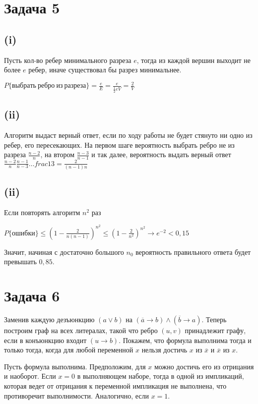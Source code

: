 \documentclass[a4paper,12pt]{article} %
\begin{document}
\section{Задача 5}
\subsection{(i)}
\hspace{5mm}
Пусть кол-во ребер минимального разреза $e$, тогда из каждой вершин выходит не более $e$ ребер, иначе существовал бы разрез минимальнее. 

$P\{выбрать\ ребро\ из\ разреза\}=\frac{e}{E}=\frac{e}{\frac{1}{2}eV}=\frac{2}{V}$

\subsection{(ii)}
\hspace{5mm}
Алгоритм выдаст верный ответ, если по ходу работы не будет стянуто ни одно из ребер, его пересекающих. На первом шаге вероятность выбрать ребро не из разреза $\frac{n-2}{n}$, на втором $\frac{n-3}{n-1}$ и так далее, вероятность выдать верный ответ $\frac{n-2}{n}\frac{n-1}{n-3}\ldots{frac{1}{3}=\frac{2}{(n-1)n}}$

\subsection{(ii)}
\hspace{5mm}
Если повторять алгоритм $n^2$ раз

$P\{ошибки\}\leq\left( 1-\frac{2}{n(n-1)}\right)^{n^2}\leq \left( 1-\frac{2}{n^2}\right)^{n^2}\rightarrow e^{-2} < 0,15$

Значит, начиная с достаточно большого $n_0$ вероятность правильного ответа будет превышать $0,85$.

\section{Задача 6}
\hspace{5mm}
Заменив каждую дезъюнкцию $(a\vee b)$ на $(\overline{a}\rightarrow b)\wedge(\overline{b}\rightarrow a)$. Теперь построим граф на всех литералах, такой что ребро $(u,v)$ принадлежит графу, если в конъюнкцию входит $(u\rightarrow b)$. Покажем, что формула выполнима тогда и только тогда, когда для любой переменной $x$ нельзя достичь $x$ из $\overline{x}$ и $\overline{x}$ из $x$.

Пусть формула выполнима. Предположим, для $x$ можно достичь его из отрицания и наоборот. Если $x=0$ в выполняющем наборе, тогда в одной из импликаций, которая ведет от отрицания к переменной импликация не выполнена, что противоречит выполнимости. Аналогично, если $x=1$.
\end{document}
